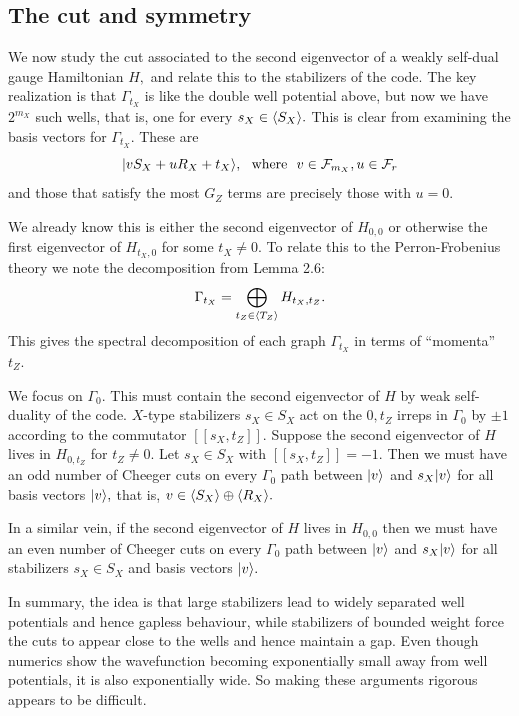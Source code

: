 \subsection{The cut and symmetry}

We now study 
the cut associated to the second eigenvector of a 
weakly self-dual gauge Hamiltonian $H,$
and relate this to the stabilizers of the code.
The key realization is that $\Gamma_{t_X}$ is like
the double well potential above,
but now we have $2^{m_X}$ such wells,
that is, one for every $s_X\in \langle S_X \rangle.$
This is clear from examining the basis vectors for $\Gamma_{t_X}.$
These are 
$$
    |{v S_X + u R_X + t_X}\rangle, \ \ \mbox{where}\ \  v\in \mathcal{F}_{m_X}, u\in\mathcal{F}_{r}
$$
and those that satisfy the most $G_Z$ terms are
precisely those with $u=0.$

We already know this is either the second eigenvector of $H_{0,0}$
or otherwise the first eigenvector of $H_{t_X,0}$ for some $t_X \ne 0.$
To relate this to the Perron-Frobenius theory we note the 
decomposition from Lemma 2.6:
$$
    \Gamma_{t_X} = \bigoplus_{t_Z\in\langle T_Z \rangle} H_{t_X, t_Z}.
$$
This gives the spectral decomposition of each graph $\Gamma_{t_X}$ 
in terms of ``momenta'' $t_Z.$

We focus on $\Gamma_0.$
This must contain the second eigenvector of $H$ by weak self-duality of the code.
$X$-type stabilizers $s_X\in S_X$ act on the $0,t_Z$ irreps in $\Gamma_0$
by $\pm 1$ according to the commutator $[[s_X, t_Z]].$
Suppose the second eigenvector of $H$ lives in
$H_{0,t_Z}$ for $t_Z\ne 0$. 
Let $s_X\in S_X$ with $[[s_X, t_Z]]=-1.$
Then we must have an odd number of Cheeger cuts 
on every $\Gamma_0$ path between $|{v}\rangle$ and $s_X|{v}\rangle$ for all basis
vectors $|{v}\rangle,$ that is, $v\in\langle S_X \rangle\oplus\langle R_X \rangle.$

In a similar vein, if the second eigenvector of $H$ lives in $H_{0,0}$
then we must have an even number of Cheeger cuts 
on every $\Gamma_0$ path between $|{v}\rangle$ and $s_X|{v}\rangle$ for all stabilizers $s_X\in S_X$
and basis vectors $|{v}\rangle.$

In summary, the idea is that large stabilizers lead to
widely separated well potentials and hence gapless behaviour,
while stabilizers of bounded weight force the cuts to
appear close to the wells and hence maintain a gap.
Even though numerics show the wavefunction becoming 
exponentially small away from well potentials,
it is also exponentially wide.
So making these arguments rigorous appears to be difficult.

